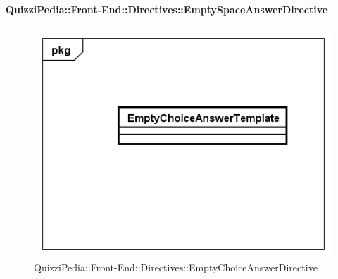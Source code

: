 		\paragraph{QuizziPedia::Front-End::Directives::EmptySpaceAnswerDirective}
		
		\label{QuizziPedia::Front-End::Directives::EmptySpaceAnswerDirective}
		
		\begin{figure}[ht]
			\centering
			\includegraphics[scale=0.5,keepaspectratio]{UML/Classi/Front-End/QuizziPedia_Front-end_Templates_EmptySpaceAnswerTemplate.png}
			\caption{QuizziPedia::Front-End::Directives::EmptyChoiceAnswerDirective}
		\end{figure} \FloatBarrier
		
